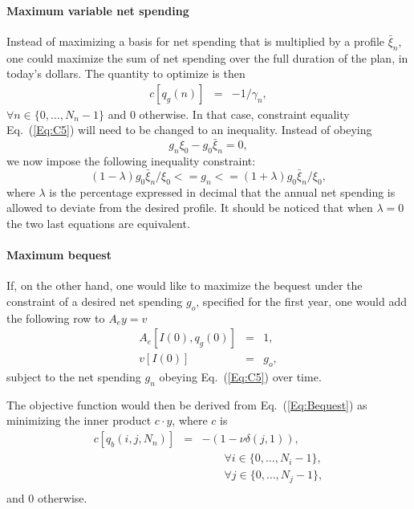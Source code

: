 \documentclass{report}[fleqn,11pt]
\begin{document}
\paragraph*{Maximum variable net spending}
Instead of maximizing a basis for net spending that is multiplied by a profile $\bar{\xi}_n$,
one could maximize the sum of net spending over the full duration
of the plan, in today's dollars. The quantity to optimize is then
\begin{eqnarray}
	c[q_g(n)] &=& -1/\gamma_n,
\end{eqnarray}
$\forall n \in \{0, \ldots, N_n-1\}$ and 0 otherwise.
In that case, constraint equality Eq.~(\ref{Eq:C5}) will need to be changed to an inequality. 
Instead of obeying 
\begin{equation}
	g_n \xi_0 - g_0 \bar{\xi}_n = 0,
\end{equation}
we now impose the following inequality constraint:
\begin{equation}
        \label{Eq:C15}
	(1 - \lambda) g_0 \bar{\xi}_n/\xi_0 <= g_n <= (1 + \lambda) g_0 \bar{\xi}_n/\xi_0 ,
\end{equation}
where $\lambda$ is the percentage expressed in decimal that the annual net spending is allowed to deviate
from the desired profile. It should be noticed that when $\lambda = 0$ the two
last equations are equivalent.

\paragraph*{Maximum bequest}
If, on the other hand, one would like to maximize the bequest under the constraint of a desired
net spending $g_o$, specified for the first year,
one would add the following row to $A_ey = v$
\begin{eqnarray}
	\label{Eq:FixedIncome}
	A_e[I(0), q_g(0)] &=& 1, \nonumber \\
	v[I(0)] &=& g_o,
\end{eqnarray}
subject to the net spending $g_n$ obeying Eq.~(\ref{Eq:C5}) over time.

The objective function would then be derived from Eq.~(\ref{Eq:Bequest}) as
minimizing the inner product $c\cdot y$, where $c$ is
\begin{eqnarray}
	\label{Eq:MaxBequest}
	c[q_b(i, j, N_n)] &=& -(1 - \nu\delta(j, 1)),\\
	&&\qquad\forall i \in \{0,\ldots, N_i-1\},\nonumber\\
	&&\qquad\forall j \in \{0,\ldots, N_j-1\},\nonumber\\
\end{eqnarray}
and 0 otherwise.
\end{document}
